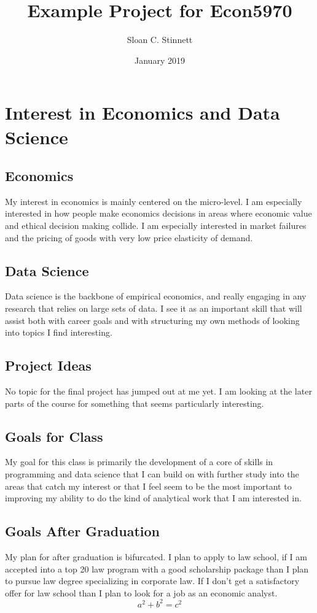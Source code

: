 \documentclass{article}
\title{Example Project for Econ5970}
\author{Sloan C. Stinnett}
\date{January 2019}
\begin{document}
\maketitle

\section{Interest in Economics and Data Science}
\subsection{Economics}
My interest in economics is mainly centered on the micro-level. I am especially interested in how people make economics decisions in areas where economic value and ethical decision making collide. I am especially interested in market failures and the pricing of goods with very low price elasticity of demand. 
\subsection{Data Science}
Data science is the backbone of empirical economics, and really engaging in any research that relies on large sets of data. I see it as an important skill that will assist both with career goals and with structuring my own methods of looking into topics I find interesting.
\subsection{Project Ideas}
No topic for the final project has jumped out at me yet. I am looking at the later parts of the course for something that seems particularly interesting. 
\subsection{Goals for Class}
My goal for this class is primarily the development of a core of skills in programming and data science that I can build on with further study into the areas that catch my interest or that I feel seem to be the most important to improving my ability to do the kind of analytical work that I am interested in. 
\subsection{Goals After Graduation}
My plan for after graduation is bifurcated. I plan to apply to law school, if I am accepted into a top 20 law program with a good scholarship package than I plan to pursue law degree specializing in corporate law. If I don't get a satisfactory offer for law school than I plan to look for a job as an economic analyst.  
$$ a^2+b^2=c^2 $$
\end{document}
